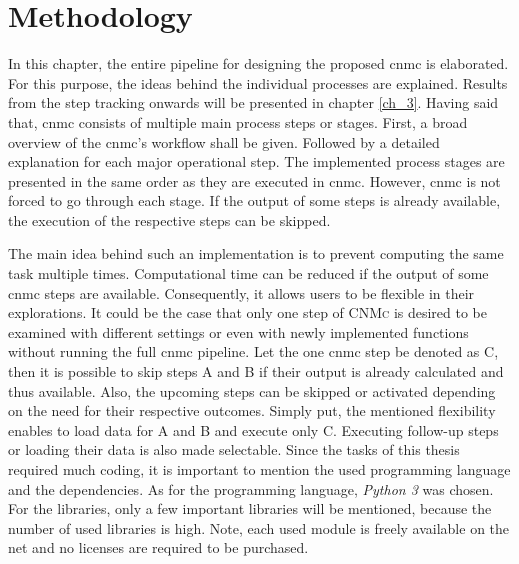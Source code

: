 \chapter{Methodology}
\label{chap_2_Methodlogy}
In this chapter, the entire pipeline for designing the proposed
\gls{cnmc} is elaborated. For this purpose, the ideas behind 
the individual processes are explained. 
Results from the step tracking onwards will be presented in chapter \ref{ch_3}.
Having said that, \gls{cnmc} consists of multiple main process steps or stages. 
First, a broad overview of the \gls{cnmc}'s workflow shall be given.
Followed by a detailed explanation for each major operational step. The 
implemented process stages are presented in the same order as they are 
executed in \gls{cnmc}. However, \gls{cnmc} is not forced 
to go through each stage. If the output of some steps is 
already available, the execution of the respective steps can be skipped. \newline

The main idea behind such an implementation is to prevent computing the same task multiple times.
Computational time can be reduced if the output of some \gls{cnmc} steps are available. 
Consequently, it allows users to be flexible in their explorations. 
It could be the case that only one step of \textsc{CNMc} is desired to be examined with different settings or even with newly implemented functions without running the full \gls{cnmc} pipeline. 
Let the one \gls{cnmc} step be denoted as C, then it is possible to skip steps A and B if their output is already calculated and thus available.
Also, the upcoming steps can be skipped or activated depending on the need for their respective outcomes. 
Simply put, the mentioned flexibility enables to load data for A and B and execute only C. Executing follow-up steps or loading their data is also made selectable.
%
%
Since the tasks of this thesis required much coding, 
it is important to 
mention the used programming language and the dependencies. 
As for the programming language,
\emph{Python 3} \cite{VanRossum2009} was chosen. For the libraries, only a few important libraries will be mentioned, because the number of used libraries is high. Note, each used module is 
freely available on the net and no licenses are required to be purchased.
\newline 

